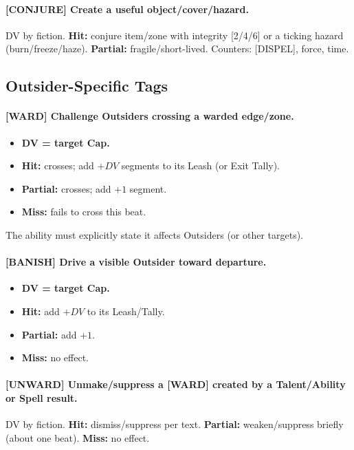 \paragraph{[CONJURE] Create a useful object/cover/hazard.}
DV by fiction. \textbf{Hit:} conjure item/zone with integrity [2/4/6] or a ticking hazard (burn/freeze/haze). \textbf{Partial:} fragile/short-lived. 
Counters: [DISPEL], force, time.

\subsection{Outsider-Specific Tags}
\label{sec:tags-outsiders}
\paragraph{[WARD] Challenge Outsiders crossing a warded edge/zone.}
\begin{itemize}
  \item \textbf{DV = target Cap.}
  \item \textbf{Hit:} crosses; add $+DV$ segments to its Leash (or Exit Tally).
  \item \textbf{Partial:} crosses; add $+1$ segment.
  \item \textbf{Miss:} fails to cross this beat.
\end{itemize}
The ability must explicitly state it affects Outsiders (or other targets).

\paragraph{[BANISH] Drive a visible Outsider toward departure.}
\begin{itemize}
  \item \textbf{DV = target Cap.}
  \item \textbf{Hit:} add $+DV$ to its Leash/Tally.
  \item \textbf{Partial:} add $+1$.
  \item \textbf{Miss:} no effect.
\end{itemize}

\paragraph{[UNWARD] Unmake/suppress a [WARD] created by a Talent/Ability or Spell result.}
DV by fiction. \textbf{Hit:} dismiss/suppress per text. \textbf{Partial:} weaken/suppress briefly (about one beat). \textbf{Miss:} no effect.


